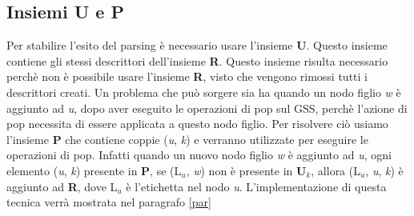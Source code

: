 \subsection{Insiemi U e P}
Per stabilire l'esito del parsing è necessario usare l'insieme \textbf{U}. Questo insieme contiene gli stessi descrittori dell'insieme \textbf{R}. Questo insieme risulta necessario perchè non è possibile usare l'insieme \textbf{R}, visto che vengono rimossi tutti i descrittori creati. Un problema \cite{pubblicazione: scott} che può sorgere sia ha quando un nodo figlio \textit{w} è aggiunto ad \textit{u}, dopo aver eseguito le operazioni di pop sul GSS, perchè l'azione di pop necessita di essere applicata a questo nodo figlio. Per risolvere ciò usiamo l'insieme \textbf{P} che contiene coppie (\textit{u}, \textit{k}) e verranno utilizzate per eseguire le operazioni di pop. Infatti quando un nuovo nodo figlio \textit{w} è aggiunto ad \textit{u}, ogni elemento (\textit{u}, \textit{k}) presente in \textbf{P}, se (L$_u$, \textit{w}) non è presente in \textbf{U$_k$}, allora (L$_u$, \textit{u}, \textit{k}) è aggiunto ad \textbf{R}, dove L$_u$ è l'etichetta nel nodo \textit{u}. L'implementazione di questa tecnica verrà mostrata nel paragrafo \ref{par}  
